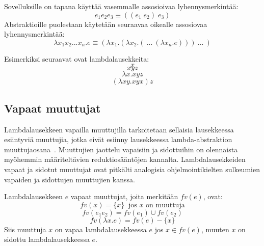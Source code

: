 Sovelluksille on tapana käyttää vasemmalle assosioivaa lyhennysmerkintää: 
\[e_{1} e_{2} e_{3} \equiv ((e_{1} \; e_{2}) \; e_{3})\]
Abstraktioille puolestaan käytetään seuraavaa oikealle assosiovaa lyhennysmerkintää: 
\[ \lambda x_{1}x_{2}...x_{n}.e \equiv (\lambda x_{1} . ( \lambda x_{2} . ( \: ... \: ( \lambda x_{n} . e ))) \: ... \: ) \]

\par
Esimerkiksi seuraavat ovat lambdalausekkeita:
\[ x \]
\[ xyz \]
\[ \lambda x . xyz \]
\[ (\lambda xy . xyx) z \]


\subsection{Vapaat muuttujat}

Lambdalausekkeen vapailla muuttujilla tarkoitetaan sellaisia lausekkeessa esiintyviä muuttujia, jotka eivät esiinny lausekkeessa lambda-abstraktion muuttujaosana~\cite[s.~8]{Hudak89}. Muuttujien jaottelu vapaisiin ja sidottuihin on olennaista myöhemmin määriteltävien reduktiosääntöjen kannalta. Lambdalausekkeiden vapaat ja sidotut muuttujat ovat pitkälti analogisia ohjelmointikielten sulkeumien vapaiden ja sidottujen muuttujien kanssa.

\begin{maar}
Lambdalausekkeen $e$ vapaat muuttujat, joita merkitään $fv(e)$, ovat: 
\[fv(x) = \{x\}\ \text{ jos } x \text{ on muuttuja} \]
\[fv(e_{1}e_{2}) = fv(e_{1}) \cup fv(e_{2}) \]
\[ fv(\lambda x.e) = fv(e) - \{x\} \]
Siis muuttuja $x$ on vapaa lambdalausekkeessa $e$ jos $x \in fv(e)$, muuten $x$ on sidottu lambdalausekkeessa $e$.
\end{maar} 

